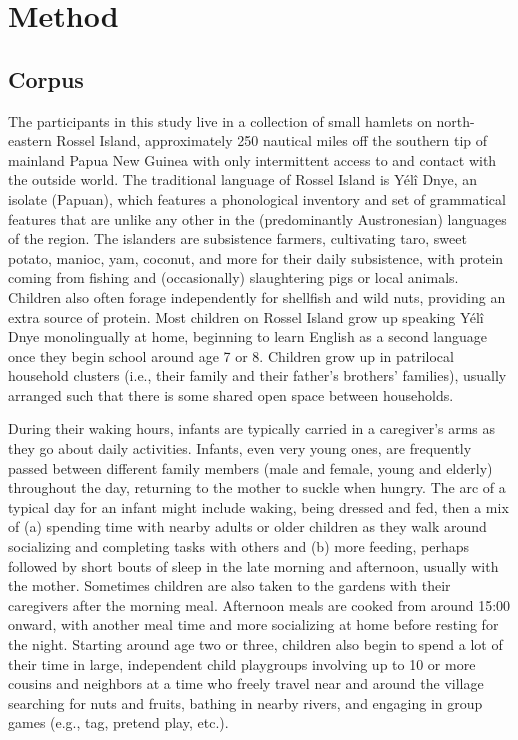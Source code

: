 \documentclass[,man,mask,floatsintext]{apa6}
\begin{document}
\section{Method}\label{methods}

\subsection{Corpus}\label{methods-dataset}

The participants in this study live in a collection of small hamlets on
north-eastern Rossel Island, approximately 250 nautical miles off the
southern tip of mainland Papua New Guinea with only intermittent access
to and contact with the outside world. The traditional language of
Rossel Island is Yélî Dnye, an isolate (Papuan), which features a
phonological inventory and set of grammatical features that are unlike
any other in the (predominantly Austronesian) languages of the region.
The islanders are subsistence farmers, cultivating taro, sweet potato,
manioc, yam, coconut, and more for their daily subsistence, with protein
coming from fishing and (occasionally) slaughtering pigs or local
animals. Children also often forage independently for shellfish and wild
nuts, providing an extra source of protein. Most children on Rossel
Island grow up speaking Yélî Dnye monolingually at home, beginning to
learn English as a second language once they begin school around age 7
or 8. Children grow up in patrilocal household clusters (i.e., their
family and their father's brothers' families), usually arranged such
that there is some shared open space between households.

During their waking hours, infants are typically carried in a
caregiver's arms as they go about daily activities. Infants, even very
young ones, are frequently passed between different family members (male
and female, young and elderly) throughout the day, returning to the
mother to suckle when hungry. The arc of a typical day for an infant
might include waking, being dressed and fed, then a mix of (a) spending
time with nearby adults or older children as they walk around
socializing and completing tasks with others and (b) more feeding,
perhaps followed by short bouts of sleep in the late morning and
afternoon, usually with the mother. Sometimes children are also taken to
the gardens with their caregivers after the morning meal. Afternoon
meals are cooked from around 15:00 onward, with another meal time and
more socializing at home before resting for the night. Starting around
age two or three, children also begin to spend a lot of their time in
large, independent child playgroups involving up to 10 or more cousins
and neighbors at a time who freely travel near and around the village
searching for nuts and fruits, bathing in nearby rivers, and engaging in
group games (e.g., tag, pretend play, etc.).
\end{document}
